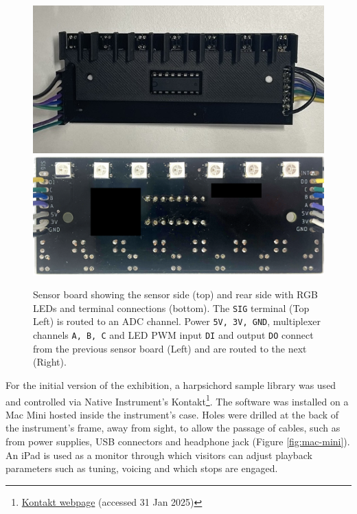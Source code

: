 \begin{figure}[!b] 
  \centering
  \includegraphics[width=\linewidth,trim={0 1.5cm 0 1.5cm},clip]{src/images/sensor-board-w-baffles.jpeg}
    \\
  \includegraphics[width=\linewidth]{src/images/sensor-board-reverse-side-anon.png} 
  \caption{Sensor board showing the sensor side (top) and rear side with RGB LEDs and terminal connections (bottom). The \texttt{SIG} terminal (Top Left) is routed to an ADC channel. Power \texttt{5V, 3V, GND}, multiplexer channels \texttt{A, B, C} and LED PWM input \texttt{DI} and output \texttt{DO}  connect from the previous sensor board (Left) and are routed to the next (Right).}
  \Description{} 
  \label{fig:sensor-reverse}
\end{figure}

For the initial version of the exhibition, a harpsichord sample library was used and controlled via Native Instrument's Kontakt\footnote{\href{https://www.native-instruments.com/en/products/komplete/samplers/kontakt-8/?srsltid=AfmBOorKUf43SoIxGBS2-GnXmKHHkgcfcfWRskpweDhLSG3FiF0qrf2w}{Kontakt webpage} (accessed 31 Jan 2025)}. The software was installed on a Mac Mini hosted inside the instrument's case. Holes were drilled at the back of the instrument's frame, away from sight, to allow the passage of cables, such as from power supplies, USB connectors and headphone jack (Figure \ref{fig:mac-mini}). 
An iPad is used as a monitor through which visitors can adjust playback parameters such as tuning, voicing and which stops are engaged. 


